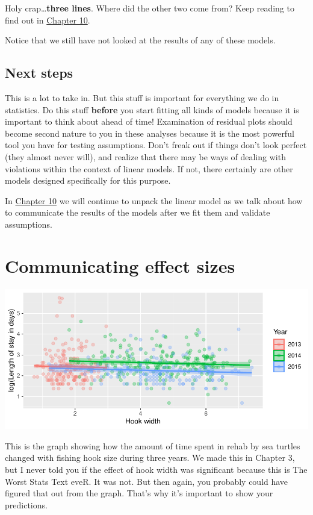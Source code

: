 \documentclass[
]{book}
\begin{document}
Holy crap\ldots{}\textbf{three lines}. Where did the other two come from? Keep reading to find out in \protect\hyperlink{Chapter10}{Chapter 10}.

Notice that we still have not looked at the results of any of these models.

\hypertarget{next9}{%
\section{Next steps}\label{next9}}

This is a lot to take in. But this stuff is important for everything we do in statistics. Do this stuff \textbf{before} you start fitting all kinds of models because it is important to think about ahead of time! Examination of residual plots should become second nature to you in these analyses because it is the most powerful tool you have for testing assumptions. Don't freak out if things don't look perfect (they almost never will), and realize that there may be ways of dealing with violations within the context of linear models. If not, there certainly are other models designed specifically for this purpose.

In \protect\hyperlink{Chapter10}{Chapter 10} we will continue to unpack the linear model as we talk about how to communicate the results of the models after we fit them and validate assumptions.

\hypertarget{Chapter10}{%
\chapter{Communicating effect sizes}\label{Chapter10}}

\includegraphics{worstr_files/figure-latex/unnamed-chunk-244-1.pdf}

This is the graph showing how the amount of time spent in rehab by sea turtles changed with fishing hook size during three years. We made this in Chapter 3, but I never told you if the effect of hook width was significant because this is The Worst Stats Text eveR. It was not. But then again, you probably could have figured that out from the graph. That's why it's important to show your predictions.
\end{document}
